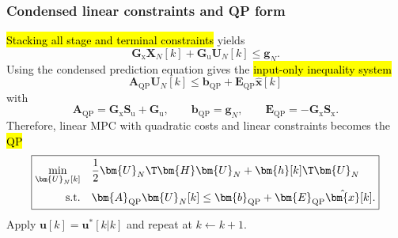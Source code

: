 \begin{frame}
	\frametitle{Condensed linear constraints and QP form}
	\hl{Stacking all stage and terminal constraints} yields
	\begin{equation}
		\bm{G}_{\mathrm{x}}\bm{X}_{N}[k]+\bm{G}_{\mathrm{u}}\bm{U}_{N}[k]\leq \bm{g}_{N}.
	\end{equation}\pause%
	Using the condensed prediction equation gives the \hl{input-only inequality system}
	\begin{equation}
		\boxed{\bm{A}_{\mathrm{QP}}\bm{U}_{N}[k]\leq \bm{b}_{\mathrm{QP}}+\bm{E}_{\mathrm{QP}}\hat{\bm{x}}[k]}
	\end{equation}
	with
	\begin{equation}
		\bm{A}_{\mathrm{QP}}=\bm{G}_{\mathrm{x}}\bm{S}_{\mathrm{u}}+\bm{G}_{\mathrm{u}},
		\qquad
		\bm{b}_{\mathrm{QP}}=\bm{g}_{N},
		\qquad
		\bm{E}_{\mathrm{QP}}=-\bm{G}_{\mathrm{x}}\bm{S}_{\mathrm{x}}.
	\end{equation}\pause%
	Therefore, linear MPC with quadratic costs and linear constraints becomes the \hl{QP}
	\begin{equation}
		\boxed{
			\begin{aligned}
				\min_{\bm{U}_{N}[k]}\quad & \frac{1}{2}\bm{U}_{N}\T\bm{H}\bm{U}_{N}
				+\bm{h}[k]\T\bm{U}_{N}                                                                                                      \\
				\mathrm{s.t.}\quad        & \bm{A}_{\mathrm{QP}}\bm{U}_{N}[k]\leq \bm{b}_{\mathrm{QP}}+\bm{E}_{\mathrm{QP}}\hat{\bm{x}}[k].
			\end{aligned}}
	\end{equation}\pause%
	Apply $\bm{u}[k]=\bm{u}^{*}[k|k]$ and repeat at $k\leftarrow k+1$.
\end{frame}

